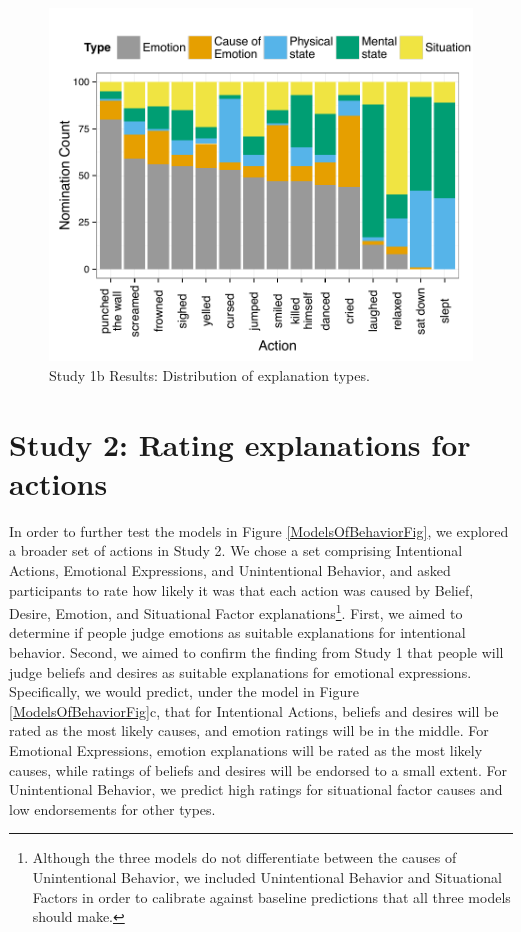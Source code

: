 \documentclass[10pt,letterpaper]{article}
\begin{document}
\begin{figure}[thb]
\begin{center}\includegraphics[width=1\columnwidth]{images/study1b_codePlot.pdf}\end{center}
\caption{ Study 1b Results: Distribution of explanation types. }
\label{Study1bResultsFig}
\end{figure}






\section{Study 2: Rating explanations for actions}


In order to further test the models in Figure \ref{ModelsOfBehaviorFig}, we explored a broader set of actions in Study 2. 
We chose a set comprising Intentional Actions, Emotional Expressions, and Unintentional Behavior, and asked participants to rate how likely it was that each action was caused by Belief, Desire, Emotion, and Situational Factor explanations\footnote{Although the three models do not differentiate between the causes of Unintentional Behavior, we included Unintentional Behavior and Situational Factors in order to calibrate against baseline predictions that all three models should make.
}. First, we aimed to determine if people judge emotions as suitable explanations for intentional behavior. Second, we aimed to confirm the finding from Study 1 that people will judge beliefs and desires as suitable explanations for emotional expressions. 
Specifically, we would predict, under the model in Figure \ref{ModelsOfBehaviorFig}c, that for Intentional Actions, beliefs and desires will be rated as the most likely causes, and emotion ratings will be in the middle. For Emotional Expressions, emotion explanations will be rated as the most likely causes, while ratings of beliefs and desires will be endorsed to a small extent. For Unintentional Behavior, we predict high ratings for situational factor causes and low endorsements for other types.
\end{document}
